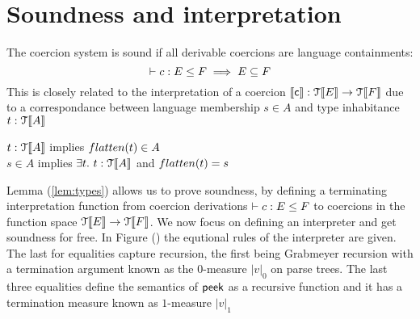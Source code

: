 \documentclass[a4paper,UKenglish,cleveref, autoref, thm-restate]{lipics-v2021}
\begin{document}




\section{Soundness and interpretation} \label{sec:soundinterp}
The coercion system is sound if all derivable coercions are language containments:
\[\contains{}{c}{E}{F} \implies E \subseteq F\]
This is closely related to the interpretation of a coercion $\llbracket \textsf{c} \rrbracket : \mathcal{T}\llbracket E \rrbracket \rightarrow \mathcal{T}\llbracket F \rrbracket$ due to a correspondance between language membership $s \in A$ and type inhabitance $\mathsf{t} : \type{A}$
\begin{lemma}\label{lem:types}
$\mathsf{t} : \type{A}$ implies $\flatten{\mathsf{t}} \in A$\\
$s \in A$ implies $\exists \mathsf{t}.~\mathsf{t} : \type{A}$ and $\flatten{\mathsf{t}} = s$
\end{lemma}
Lemma (\ref{lem:types}) allows us to prove soundness, by defining a terminating interpretation function from coercion derivations $\contains{}{c}{E}{F}$ to coercions in the function space $\mathcal{T}\llbracket E \rrbracket \rightarrow \mathcal{T}\llbracket F \rrbracket$.
We now focus on defining an interpreter and get soundness for free. In Figure (\label{fig:interp}) the equtional rules of the interpreter are given. The last for equalities capture recursion, the first being Grabmeyer recursion with a termination argument known as the $0$-measure $|v|_0$ on parse trees. The last three equalities define the semantics of $\textsf{peek}$ as a recursive function and it has a termination measure known as $1$-measure $|v|_1$ 
\end{document}
